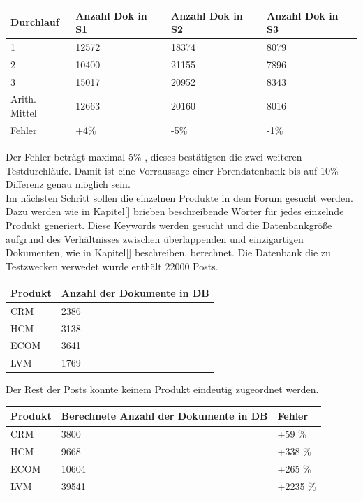 \begin{tabular}{ | p{3cm} | p{3cm} | p{3cm}| p{3cm} |}
\hline
Durchlauf & Anzahl Dok in S1 & Anzahl Dok in S2 & Anzahl Dok in S3 \\ \hline
1 & 12572  & 18374 & 8079 \\ \hline
2 & 10400 & 21155 & 7896 \\ \hline
3 & 15017 & 20952 & 8343  \\ \hline
Arith. Mittel & 12663 & 20160 & 8016 \\ \hline
Fehler & +4\% & -5\% & -1\% \\ \hline
\end{tabular}

Der Fehler beträgt maximal 5\% , dieses bestätigten die zwei weiteren Testdurchläufe. Damit ist eine Vorraussage einer Forendatenbank bis auf 10\% Differenz genau möglich sein.\\

Im nächsten Schritt sollen die einzelnen Produkte in dem Forum gesucht werden. Dazu werden wie in Kapitel[] brieben beschreibende Wörter für jedes einzelnde Produkt generiert. Diese Keywords werden gesucht und die Datenbankgröße aufgrund des Verhältnisses zwischen überlappenden und einzigartigen Dokumenten, wie in Kapitel[] beschreiben, berechnet. Die Datenbank die zu Testzwecken verwedet wurde enthält 22000 Posts.\\

\begin{tabular}{ | p{3cm} | l |}
\hline
Produkt & Anzahl der Dokumente in DB \\ \hline
CRM & 2386 \\ \hline
HCM & 3138 \\ \hline
ECOM & 3641  \\ \hline
LVM & 1769 \\ \hline
\end{tabular}

Der Rest der Posts konnte keinem Produkt eindeutig zugeordnet werden.

\begin{tabular}{ | p{3cm} | l | l |}
\hline
Produkt & Berechnete Anzahl der Dokumente in DB & Fehler\\ \hline
CRM & 3800 & +59 \%\\ \hline
HCM & 9668 & +338 \% \\ \hline
ECOM & 10604  & +265 \%\\ \hline
LVM & 39541 & +2235 \%\\ \hline
\end{tabular}

